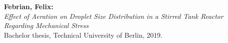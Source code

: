 \newpage


\thispagestyle{empty}                   %

\vspace*{\fill}

\footnotesize
\noindent
\textbf{Febrian, Felix:} \\
\textit{Effect of Aeration on Droplet Size Distribution in a Stirred Tank Reactor Regarding Mechanical Stress} \\
Bachelor thesis, Technical University of Berlin, 2019.
\restoregeometry
\normalsize